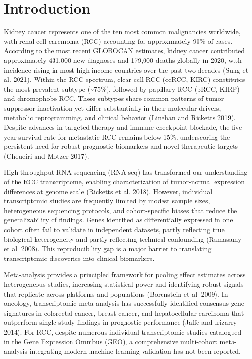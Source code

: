 \documentclass[
  12pt,
]{article}
\begin{document}
\section{Introduction}\label{introduction}

Kidney cancer represents one of the ten most common malignancies
worldwide, with renal cell carcinoma (RCC) accounting for approximately
90\% of cases. According to the most recent GLOBOCAN estimates, kidney
cancer contributed approximately 431,000 new diagnoses and 179,000
deaths globally in 2020, with incidence rising in most high-income
countries over the past two decades (Sung et al. 2021). Within the RCC
spectrum, clear cell RCC (ccRCC, KIRC) constitutes the most prevalent
subtype (\textasciitilde75\%), followed by papillary RCC (pRCC, KIRP)
and chromophobe RCC. These subtypes share common patterns of tumor
suppressor inactivation yet differ substantially in their molecular
drivers, metabolic reprogramming, and clinical behavior (Linehan and
Ricketts 2019). Despite advances in targeted therapy and immune
checkpoint blockade, the five-year survival rate for metastatic RCC
remains below 15\%, underscoring the persistent need for robust
prognostic biomarkers and novel therapeutic targets (Choueiri and Motzer
2017).

High-throughput RNA sequencing (RNA-seq) has transformed our
understanding of the RCC transcriptome, enabling characterization of
tumor-normal expression differences at genome scale (Ricketts et al.
2018). However, individual transcriptomic studies are frequently limited
by modest sample sizes, heterogeneous sequencing protocols, and
cohort-specific biases that reduce the generalizability of findings.
Genes identified as differentially expressed in one cohort often fail to
validate in independent datasets, partly reflecting true biological
heterogeneity and partly reflecting technical confounding (Ramasamy et
al. 2008). This reproducibility gap is a major barrier to translating
transcriptomic discoveries into clinical biomarkers.

Meta-analysis provides a principled framework for pooling effect
estimates across heterogeneous studies, increasing statistical power and
identifying robust signals that replicate across platforms and
populations (Borenstein et al. 2009). In oncology, transcriptomic
meta-analysis has successfully identified consensus gene signatures in
colorectal cancer, breast cancer, and hepatocellular carcinoma that
outperform single-study findings in prognostic performance (Jaffe and
Irizarry 2014). For RCC, despite numerous individual transcriptomic
studies catalogued in the Gene Expression Omnibus (GEO), a comprehensive
multi-cohort meta-analysis integrating modern machine learning
validation has not been reported.
\end{document}
